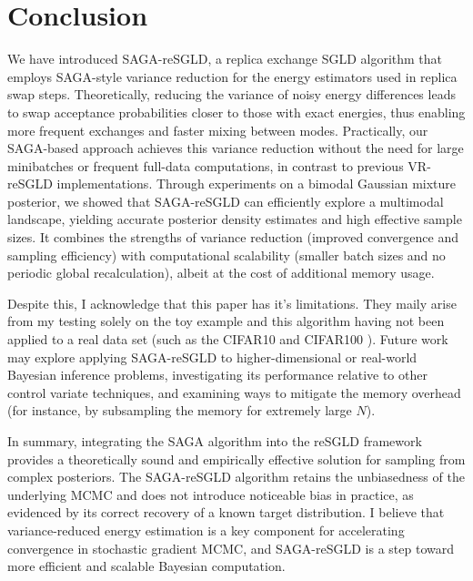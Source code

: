 \documentclass{article}
\begin{document}
\newpage

\section{Conclusion}
We have introduced SAGA-reSGLD, a replica exchange SGLD algorithm that employs SAGA-style variance reduction for the energy estimators used in replica swap steps. Theoretically, reducing the variance of noisy energy differences leads to swap acceptance probabilities closer to those with exact energies, thus enabling more frequent exchanges and faster mixing between modes. Practically, our SAGA-based approach achieves this variance reduction without the need for large minibatches or frequent full-data computations, in contrast to previous VR-reSGLD implementations. Through experiments on a bimodal Gaussian mixture posterior, we showed that SAGA-reSGLD can efficiently explore a multimodal landscape, yielding accurate posterior density estimates and high effective sample sizes. It combines the strengths of variance reduction (improved convergence and sampling efficiency) with computational scalability (smaller batch sizes and no periodic global recalculation), albeit at the cost of additional memory usage.

Despite this, I acknowledge that this paper has it's limitations. They maily arise from my testing solely on the toy example and this algorithm having not been applied to a real data set (such as the CIFAR10 and CIFAR100 \cite{deng2021acceleratingconvergencereplicaexchange}). Future work may explore applying SAGA-reSGLD to higher-dimensional or real-world Bayesian inference problems, investigating its performance relative to other control variate techniques, and examining ways to mitigate the memory overhead (for instance, by subsampling the memory for extremely large $N$).

In summary, integrating the SAGA algorithm into the reSGLD framework provides a theoretically sound and empirically effective solution for sampling from complex posteriors. The SAGA-reSGLD algorithm retains the unbiasedness of the underlying MCMC and does not introduce noticeable bias in practice, as evidenced by its correct recovery of a known target distribution. I believe that variance-reduced energy estimation is a key component for accelerating convergence in stochastic gradient MCMC, and SAGA-reSGLD is a step toward more efficient and scalable Bayesian computation.

\newpage
   

\end{document}
